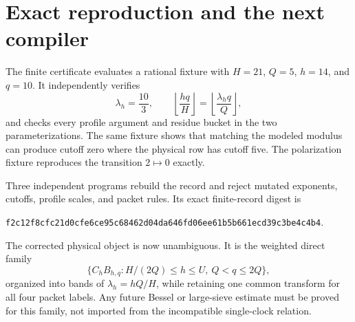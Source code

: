 \section{Exact reproduction and the next compiler}

The finite certificate evaluates a rational fixture with
$H=21$, $Q=5$, $h=14$, and $q=10$.  It independently verifies
\[
 \lambda_h=\frac{10}{3},\qquad
 \left\lfloor\frac{hq}{H}\right\rfloor
 =\left\lfloor\frac{\lambda_hq}{Q}\right\rfloor,
\]
and checks every profile argument and residue bucket in the two parameterizations.
The same fixture shows that matching the modeled modulus can produce cutoff zero
where the physical row has cutoff five.  The polarization fixture reproduces the
transition $2\mapsto0$ exactly.

Three independent programs rebuild the record and reject mutated exponents, cutoffs,
profile scales, and packet rules.  Its exact finite-record digest is
\begin{center}
\texttt{f2c12f8cfc21d0cfe6ce95c68462d04da646fd06ee61b5b661ecd39c3be4c4b4}.
\end{center}

The corrected physical object is now unambiguous.  It is the weighted direct family
\[
 \bigl\{C_hB_{h,q}: H/(2Q)\le h\le U,\ Q<q\le2Q\bigr\},
\]
organized into bands of $\lambda_h=hQ/H$, while retaining one common transform for
all four packet labels.  Any future Bessel or large-sieve estimate must be proved for
this family, not imported from the incompatible single-clock relation.
